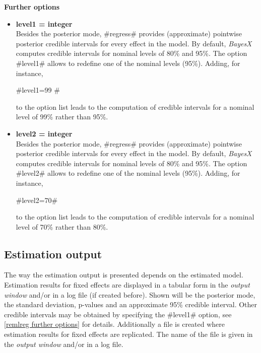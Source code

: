 {\bf Further options} \label{remlreg further options}

  
\begin{itemize}
\item \label{remlreglevel1} {\bf level1 = integer} \\
Besides the posterior mode, #regress# provides (approximate)
pointwise posterior credible intervals for every effect in the
model. By default, {\em BayesX} computes credible intervals for
nominal levels of 80\% and 95\%. The option #level1# allows to
redefine one of the nominal levels (95\%). Adding, for instance,

#level1=99 #

to the option list leads to the computation of credible intervals
for a nominal level of 99\% rather than 95\%.
\item \label{remlreglevel2} {\bf level2 = integer} \\
Besides the posterior mode, #regress# provides (approximate)
pointwise posterior credible intervals for every effect in the
model. By default, {\em BayesX} computes credible intervals for
nominal levels of 80\% and 95\%. The option #level2# allows to
redefine one of the nominal levels (95\%). Adding, for instance,

#level2=70#

to the option list leads to the computation of credible intervals
for a nominal level of 70\% rather than 80\%.
\end{itemize}

\subsection{Estimation output}

The way the estimation output is presented depends on the
estimated model. Estimation results for fixed effects are
displayed in a tabular form in the {\em output window} and/or in a
log file (if created before). Shown will be the posterior mode,
the standard deviation, p-values and an approximate 95\% credible
interval. Other credible intervals may be obtained by specifying
the #level1# option, see \autoref{remlreg further options} for
details. Additionally a file is created where estimation results
for fixed effects are replicated. The name of the file is given in
the {\em output window} and/or in a log file.

